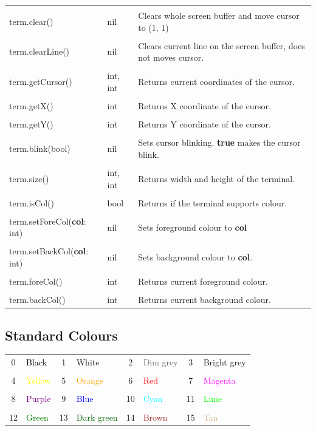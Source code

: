 \documentclass[10pt, stock]{memoir}
\begin{document}
\begin{tabularx}{\textwidth}{l l X}
	\\ \\
	term.clear() & nil & Clears whole screen buffer and move cursor to (1, 1)
	\\ \\
	term.clearLine() & nil & Clears current line on the screen buffer, does not moves cursor.
	\\ \\
	term.getCursor() & int, int & Returns current coordinates of the cursor.
	\\ \\
	term.getX() & int & Returns X coordinate of the cursor.
	\\ \\
	term.getY() & int & Returns Y coordinate of the cursor.
	\\ \\
	term.blink(bool) & nil & Sets cursor blinking. \textbf{true} makes the cursor blink.
	\\ \\
	term.size() & int, int & Returns width and height of the terminal.
	\\ \\
	term.isCol() & bool & Returns if the terminal supports colour.
	\\ \\
	term.setForeCol(\textbf{col}: int) & nil & Sets foreground colour to \textbf{col}
	\\ \\
	term.setBackCol(\textbf{col}: int) & nil & Sets background colour to \textbf{col}.
	\\ \\
	term.foreCol() & int & Returns current foreground colour.
	\\ \\
	term.backCol() & int & Returns current background colour.
\end{tabularx}

\subsection{Standard Colours}

\begin{tabularx}{\textwidth}{c l c l c l c l}
	0 & \textcolor{black}{Black} & 1 & White & 2 & \textcolor{dimgrey}{Dim grey} & 3 & \textcolor{brightgrey}{Bright grey}
	\\ \\
	4 & \textcolor{yellow}{Yellow} & 5 & \textcolor{orange}{Orange} & 6 & \textcolor{red}{Red} & 7 & \textcolor{magenta}{Magenta}
	\\ \\
	8 & \textcolor{purple}{Purple} & 9 & \textcolor{blue}{Blue} & 10 & \textcolor{cyan}{Cyan} & 11 & \textcolor{lime}{Lime}
	\\ \\
	12 & \textcolor{green}{Green} & 13 & \textcolor{darkgreen}{Dark green} & 14 & \textcolor{brown}{Brown} & 15 & \textcolor{tan}{Tan}
\end{tabularx}
\end{document}
